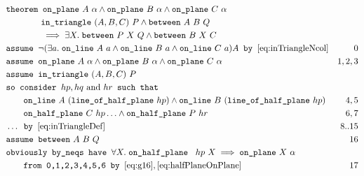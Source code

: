\begin{boxedfigure}[h]
\small
\begin{align*}
&\texttt{theorem }\code{on\_plane}\ A\ \alpha \wedge \code{on\_plane}\ B\ \alpha \wedge \code{on\_plane}\ C\ \alpha\\
&\qquad\qquad\code{in\_triangle}\ (A,B,C)\ P \wedge \between{A}{B}{Q}\\
&\qquad\qquad\implies\exists X.\; \between{P}{X}{Q} \wedge \between{B}{X}{C}\\
&\texttt{assume } \Triangle{a}{A}{B}{C}A \texttt{ by } \eqref{eq:inTriangleNcol}&0\\
&\texttt{assume } \code{on\_plane}\ A\ \alpha \wedge \code{on\_plane}\ B\ \alpha \wedge \code{on\_plane}\ C\ \alpha&1,2,3\\
  &\texttt{assume } \code{in\_triangle}\ (A,B,C)\ P\\
  &\texttt{so consider } hp, hq \text{ and } hr \texttt{ such that }\\
&\qquad \code{on\_line}\ A\ (\code{line\_of\_half\_plane}\ hp) \wedge \code{on\_line}\ B\ (\code{line\_of\_half\_plane}\ hp)& 4,5\\ 
&\qquad \code{on\_half\_plane}\ C\ hp\ldots \wedge \code{on\_half\_plane}\ P\ hr & 6,7\\
&\ldots \texttt{ by } \eqref{eq:inTriangleDef} & 8..15\\
&\texttt{assume } \between{A}{B}{Q} & 16\\
&\texttt{obviously by\_neqs have } \forall X.\; \code{on\_half\_plane }\ hp\ X \implies \code{on\_plane}\ X\ \alpha\\ &\qquad\texttt{from 0,1,2,3,4,5,6 by } \eqref{eq:g16}, \eqref{eq:halfPlaneOnPlane}& 17\\

\end{align*}
\end{boxedfigure}
